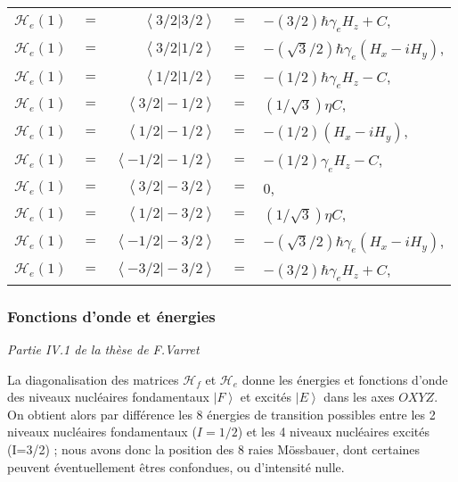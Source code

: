 \begin{tabular}{ccrcl} 
$\mathcal{H}_e(1)$&$=$&$ \left\langle 3/2 \big\vert 3/2 \right\rangle$ &$=$& $\displaystyle-(3/2)\hbar \gamma_e H_z +C$,\\
$\mathcal{H}_e(1)$&$=$&$ \left\langle 3/2 \big\vert 1/2 \right\rangle$ &$=$& $\displaystyle-(\sqrt{3}/2)\hbar \gamma_e \left(H_x - i H_y\right)$,\\
$\mathcal{H}_e(1)$&$=$&$ \left\langle 1/2 \big\vert 1/2 \right\rangle$ &$=$& $\displaystyle-(1/2)\hbar \gamma_e H_z -C$,\\
$\mathcal{H}_e(1)$&$=$&$ \left\langle 3/2 \big\vert -1/2 \right\rangle$ &$=$& $\displaystyle(1/\sqrt{3})\eta C$,\\
$\mathcal{H}_e(1)$&$=$&$ \left\langle 1/2 \big\vert -1/2 \right\rangle$ &$=$& $\displaystyle-(1/2)\left( H_x - i H_y  \right)$,\\
$\mathcal{H}_e(1)$&$=$&$ \left\langle -1/2 \big\vert -1/2 \right\rangle$ &$=$& $\displaystyle-(1/2)\gamma_e H_z -C$,\\
$\mathcal{H}_e(1)$&$=$&$ \left\langle 3/2 \big\vert -3/2 \right\rangle$ &$=$& $\displaystyle0$,\\
$\mathcal{H}_e(1)$&$=$&$ \left\langle 1/2 \big\vert -3/2 \right\rangle$ &$=$& $\displaystyle(1/\sqrt{3})\eta C$,\\
$\mathcal{H}_e(1)$&$=$&$ \left\langle -1/2 \big\vert -3/2 \right\rangle$ &$=$& $\displaystyle-(\sqrt{3}/2)\hbar \gamma_e \left(H_x - i H_y\right)$, \\
$\mathcal{H}_e(1)$&$=$&$ \left\langle -3/2 \big\vert -3/2 \right\rangle$ &$=$& $\displaystyle-(3/2)\hbar \gamma_e H_z + C$, \\
\end{tabular}

\subsubsection{Fonctions d'onde et énergies}
{\it Partie IV.1 de la thèse de F.Varret}

La diagonalisation des matrices $\mathcal{H}_f$ et $\mathcal{H}_e$ donne les énergies et fonctions d'onde des niveaux nucléaires fondamentaux $\left| F\right\rangle$ et excités $\left| E\right\rangle$ dans les axes $OXYZ$.
On obtient alors par différence les 8 énergies de transition possibles entre les 2 niveaux nucléaires fondamentaux ($I=1/2$) et les 4 niveaux nucléaires excités (I=3/2) ; nous avons donc la position des 8 raies Mössbauer, dont certaines peuvent éventuellement êtres confondues, ou d'intensité nulle. 

